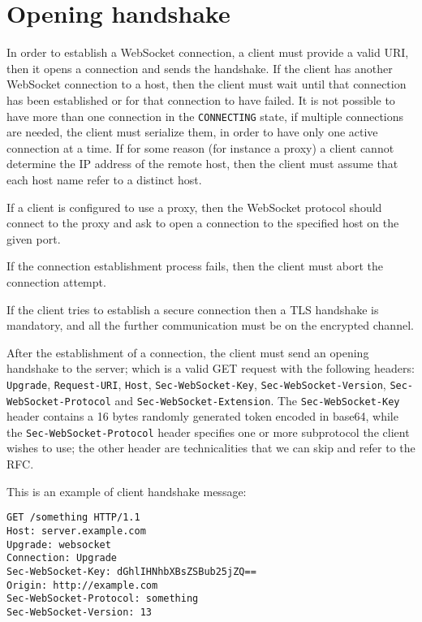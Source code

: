 \section{Opening handshake}
In order to establish a WebSocket connection, a client must provide a valid URI, then it opens a connection and sends the handshake.\newline
If the client has another WebSocket connection to a host, then the client must wait until that connection has been established or for that connection to have failed.\newline
It is not possible to have more than one connection in the \texttt{CONNECTING} state, if multiple connections are needed,
the client must serialize them, in order to have only one active connection at a time.\newline
If for some reason (for instance a proxy) a client cannot determine the IP address of the remote host,
then the client must assume that each host name refer to a distinct host.\newline

If a client is configured to use a proxy, then the WebSocket protocol should connect to the proxy and ask to open a connection to the specified host on the given port.\newline

If the connection establishment process fails, then the client must abort the connection attempt.\newline

If the client tries to establish a secure connection then a TLS handshake is mandatory, and all the further communication must be on the encrypted channel.\newline

After the establishment of a connection, the client must send an opening handshake to the server; which is a valid GET request with the following headers: \texttt{Upgrade}, \texttt{Request-URI}, \texttt{Host}, \texttt{Sec-WebSocket-Key}, \texttt{Sec-WebSocket-Version}, \texttt{Sec-WebSocket-Protocol} and \texttt{Sec-WebSocket-Extension}.\newline
The \texttt{Sec-WebSocket-Key} header contains a 16 bytes randomly generated token encoded in base64, while the \texttt{Sec-WebSocket-Protocol} header specifies one or more subprotocol the client wishes to use; the other header are technicalities that we can skip and refer to the RFC.

This is an example of client handshake message:
\begin{lstlisting}
GET /something HTTP/1.1
Host: server.example.com
Upgrade: websocket
Connection: Upgrade
Sec-WebSocket-Key: dGhlIHNhbXBsZSBub25jZQ==
Origin: http://example.com
Sec-WebSocket-Protocol: something
Sec-WebSocket-Version: 13
\end{lstlisting}

